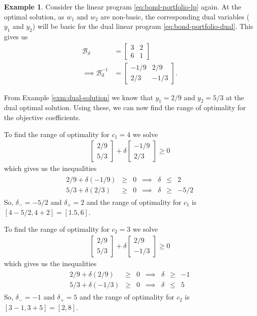 \documentclass[
]{book}
\theoremstyle{definition}
\theoremstyle{definition}
\newtheorem{example}{Example}[chapter]
\theoremstyle{definition}
\theoremstyle{definition}
\theoremstyle{remark}
\begin{document}
\begin{example}
Consider the linear program \eqref{eq:bond-portfolio-lp} again. At the optimal solution, as \(w_1\) and \(w_2\) are non-basic, the corresponding dual variables (\(y_1\) and \(y_2\)) will be basic for the dual linear program \eqref{eq:bond-portfolio-dual}. This gives us
\begin{align*}
  \mathcal{B}_d &= \begin{bmatrix} 3 & 2 \\ 6 & 1 \end{bmatrix} \\
  \implies 
  \mathcal{B}_d^{-1} &= \begin{bmatrix} -1/9 & 2/9 \\ 2/3 & -1/3 \end{bmatrix}.
\end{align*}

From Example \ref{exm:dual-solution} we know that \(y_1 = 2/9\) and \(y_2 = 5/3\) at the dual optimal solution. Using these, we can now find the range of optimality for the objective coefficients.

To find the range of optimality for \(c_1 = 4\) we solve
\begin{align*}
  \begin{bmatrix} 2/9 \\ 5/3 \end{bmatrix} 
  + 
  \delta \begin{bmatrix} -1/9 \\ 2/3 \end{bmatrix} \ge 0
\end{align*}
which gives us the inequalities
\begin{align*}
  \begin{array}{lrlrrll}
  2/9 + \delta (-1/9) & \ge & 0 & \implies & \delta & \le & 2 \\
  5/3 + \delta (2/3) & \ge & 0 & \implies & \delta & \ge & -5/2
  \end{array}
\end{align*}
So, \(\delta_- = -5/2\) and \(\delta_+ = 2\) and the range of optimality for \(c_1\) is \([4 - 5/2, 4 + 2] = [1.5, 6]\).

To find the range of optimality for \(c_2 = 3\) we solve
\begin{align*}
  \begin{bmatrix} 2/9 \\ 5/3 \end{bmatrix} 
  + 
  \delta \begin{bmatrix} 2/9 \\ -1/3 \end{bmatrix} \ge 0
\end{align*}
which gives us the inequalities
\begin{align*}
  \begin{array}{lrlrrll}
  2/9 + \delta (2/9) & \ge & 0 & \implies & \delta & \ge & -1 \\
  5/3 + \delta (-1/3) & \ge & 0 & \implies & \delta & \le & 5
  \end{array}
\end{align*}
So, \(\delta_- = -1\) and \(\delta_+ = 5\) and the range of optimality for \(c_2\) is \([3 - 1, 3 + 5] = [2, 8]\).


\end{example}
\end{document}
